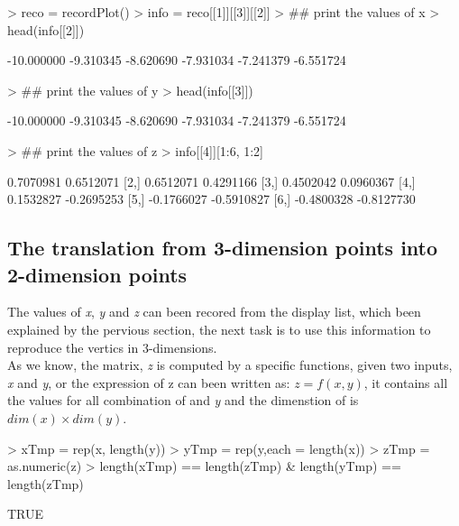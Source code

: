 \documentclass[a4paper,10pt]{article}
\begin{document}
\begin{Schunk}
\begin{Sinput}
> reco = recordPlot()
> info = reco[[1]][[3]][[2]]
> ## print the values of x
> head(info[[2]])
\end{Sinput}
\begin{Soutput}
[1] -10.000000  -9.310345  -8.620690  -7.931034  -7.241379  -6.551724
\end{Soutput}
\begin{Sinput}
> ## print the values of y
> head(info[[3]])
\end{Sinput}
\begin{Soutput}
[1] -10.000000  -9.310345  -8.620690  -7.931034  -7.241379  -6.551724
\end{Soutput}
\begin{Sinput}
> ## print the values of z
> info[[4]][1:6, 1:2]
\end{Sinput}
\begin{Soutput}
           [,1]       [,2]
[1,]  0.7070981  0.6512071
[2,]  0.6512071  0.4291166
[3,]  0.4502042  0.0960367
[4,]  0.1532827 -0.2695253
[5,] -0.1766027 -0.5910827
[6,] -0.4800328 -0.8127730
\end{Soutput}
\end{Schunk}



\subsection{The translation from 3-dimension points into 2-dimension points}
The values of \emph{x}, \emph{y} and \emph{z} can been recored from the display list, which been explained by the pervious section, the next task is to use this information to reproduce the vertics in 3-dimensions.\\

As we know, the matrix, \emph{z} is computed by a specific functions, given two inputs, \emph{x} and \emph{y}, or the expression of z can been written as: $z = f(x,y)$, it contains all the values for all combination of  and \emph{y} and the dimenstion of  is $dim(x) \times dim(y)$.\\

\begin{Schunk}
\begin{Sinput}
> xTmp = rep(x, length(y))
> yTmp = rep(y,each = length(x))
> zTmp = as.numeric(z)
> length(xTmp) == length(zTmp) & length(yTmp) == length(zTmp)
\end{Sinput}
\begin{Soutput}
[1] TRUE
\end{Soutput}
\end{Schunk}
\end{document}
